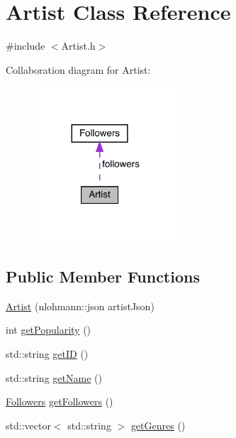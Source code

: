 \hypertarget{class_artist}{}\section{Artist Class Reference}
\label{class_artist}


{\ttfamily \#include $<$Artist.\+h$>$}



Collaboration diagram for Artist\+:
\nopagebreak
\begin{figure}[H]
\begin{center}
\leavevmode
\includegraphics[width=152pt]{class_artist__coll__graph}
\end{center}
\end{figure}
\subsection*{Public Member Functions}
\begin{DoxyCompactItemize}
\item 
\mbox{\hyperlink{class_artist_a054fa3b793609e0b63b1238f693a2ef2}{Artist}} (nlohmann\+::json artist\+Json)
\item 
int \mbox{\hyperlink{class_artist_a8d91d35e7e113becb0dbffa214baa483}{get\+Popularity}} ()
\item 
std\+::string \mbox{\hyperlink{class_artist_a6db9824940aa5cb2220e2bf527264af1}{get\+ID}} ()
\item 
std\+::string \mbox{\hyperlink{class_artist_a69924c70f35807ea4cd1208400a10c46}{get\+Name}} ()
\item 
\mbox{\hyperlink{class_followers}{Followers}} \mbox{\hyperlink{class_artist_aeebb53be1695123ed314d6637f03fdf3}{get\+Followers}} ()
\item 
std\+::vector$<$ std\+::string $>$ \mbox{\hyperlink{class_artist_a7aa936126de112dd974e168ec746ffe5}{get\+Genres}} ()
\end{DoxyCompactItemize}
